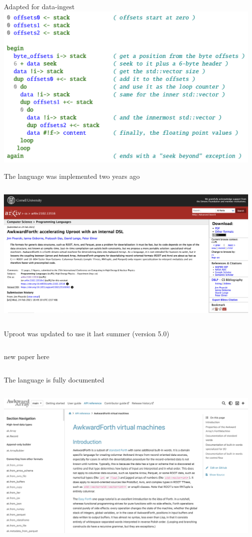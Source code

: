 \documentclass[aspectratio=169]{beamer}
\begin{document}
\begin{frame}{Adapted for data-ingest}
\vspace{0.25 cm}
\includegraphics[width=0.9\linewidth]{PLOTS/forth-parsing-example.png}
\end{frame}

\begin{frame}{The language was implemented two years ago}
\vspace{0.17 cm}
\begin{columns}
\includegraphics[width=\linewidth]{PLOTS/AwkwardForth-paper.png}
\end{columns}
\end{frame}

\begin{frame}{Uproot was updated to use it last summer (version 5.0)}
\vspace{0.17 cm}
\begin{columns}
new paper here
\end{columns}
\end{frame}

\begin{frame}{The language is fully documented}
\vspace{0.17 cm}
\begin{columns}
\includegraphics[width=\linewidth]{PLOTS/AwkwardForth-documentation.png}
\end{columns}
\end{frame}
\end{document}
